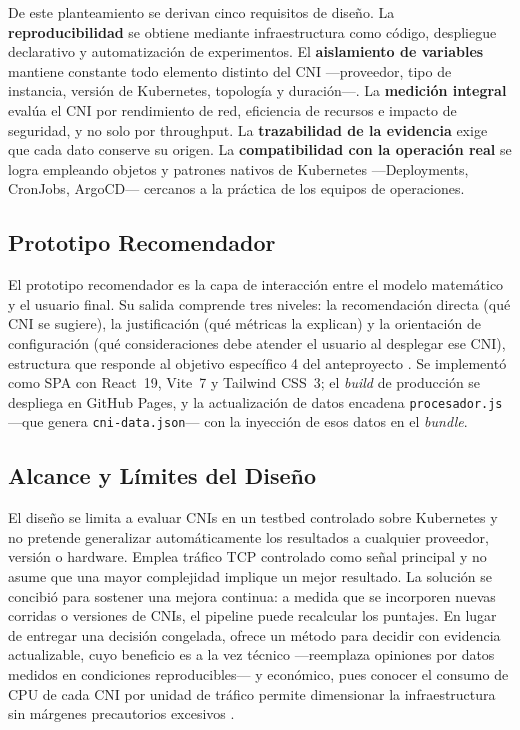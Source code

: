 De este planteamiento se derivan cinco requisitos de diseño. La \textbf{reproducibilidad} se obtiene mediante infraestructura como código, despliegue declarativo y automatización de experimentos. El \textbf{aislamiento de variables} mantiene constante todo elemento distinto del CNI ---proveedor, tipo de instancia, versión de Kubernetes, topología y duración---. La \textbf{medición integral} evalúa el CNI por rendimiento de red, eficiencia de recursos e impacto de seguridad, y no solo por throughput. La \textbf{trazabilidad de la evidencia} exige que cada dato conserve su origen. La \textbf{compatibilidad con la operación real} se logra empleando objetos y patrones nativos de Kubernetes ---Deployments, CronJobs, ArgoCD--- cercanos a la práctica de los equipos de operaciones.

\subsection{Prototipo Recomendador}

El prototipo recomendador es la capa de interacción entre el modelo matemático y el usuario final. Su salida comprende tres niveles: la recomendación directa (qué CNI se sugiere), la justificación (qué métricas la explican) y la orientación de configuración (qué consideraciones debe atender el usuario al desplegar ese CNI), estructura que responde al objetivo específico 4 del anteproyecto \cite{ref29}. Se implementó como SPA con React~19, Vite~7 y Tailwind CSS~3; el \emph{build} de producción se despliega en GitHub Pages, y la actualización de datos encadena \texttt{procesador.js} ---que genera \texttt{cni-data.json}--- con la inyección de esos datos en el \emph{bundle}.

\subsection{Alcance y Límites del Diseño}

El diseño se limita a evaluar CNIs en un testbed controlado sobre Kubernetes y no pretende generalizar automáticamente los resultados a cualquier proveedor, versión o hardware. Emplea tráfico TCP controlado como señal principal y no asume que una mayor complejidad implique un mejor resultado. La solución se concibió para sostener una mejora continua: a medida que se incorporen nuevas corridas o versiones de CNIs, el pipeline puede recalcular los puntajes. En lugar de entregar una decisión congelada, ofrece un método para decidir con evidencia actualizable, cuyo beneficio es a la vez técnico ---reemplaza opiniones por datos medidos en condiciones reproducibles--- y económico, pues conocer el consumo de CPU de cada CNI por unidad de tráfico permite dimensionar la infraestructura sin márgenes precautorios excesivos \cite{ref29}.
